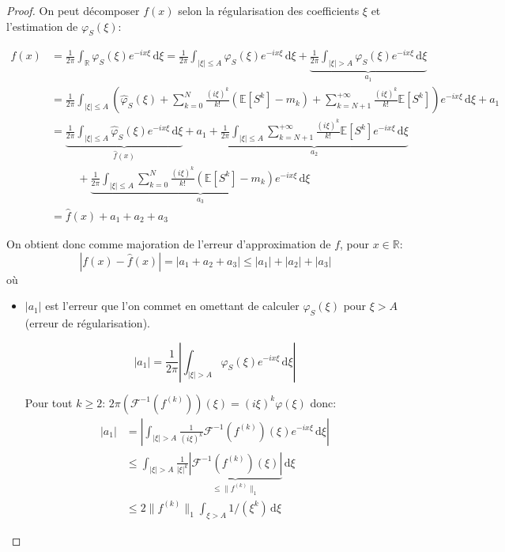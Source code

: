 \documentclass[12pt]{article}
\newcommand{\pth}[1]{\left(#1\right)}
\newcommand{\cro}[1]{\left[#1\right]}
\newcommand{\abs}[1]{\left|#1\right|}
\newcommand{\dabs}[1]{\|#1\|}
\newcommand{\esp}{\hspace{1cm}}
\newcommand{\Er}{\mathbb{R}}
\newcommand{\Esp}[1]{\mathbb{E}\cro{#1}}
\newcommand{\de}{\,\mathrm{d}}
\begin{document}
\begin{proof}
On peut décomposer $f(x)$ selon la régularisation des coefficients $\xi$ et l'estimation de $\varphi_S(\xi)$:

\begin{align*}
f(x) &= \frac1{2\pi} \int_{\mathbb R}\varphi_S(\xi)e^{-ix\xi}\de\xi
= \frac1{2\pi} \int_{\abs{\xi}\leqslant A}\varphi_S(\xi)e^{-ix\xi}\de\xi + \underbrace{\frac1{2\pi} \int_{\abs{\xi} > A}\varphi_S(\xi)e^{-ix\xi}\de\xi}_{a_1}\\
&= \frac1{2\pi} \int_{\abs{\xi}\leqslant A}\pth{\hat{\varphi}_S(\xi)+\sum_{k=0}^{N}\frac{(i\xi)^k}{k!}\pth{\Esp{S^k}-m_k}+\sum_{k=N+1}^{+\infty}\frac{(i\xi)^k}{k!}\Esp{S^k}}e^{-ix\xi}\de\xi + a_1\\
&= \underbrace{\frac1{2\pi} \int_{\abs{\xi}\leqslant A}\hat{\varphi}_S(\xi)e^{-ix\xi}\de\xi}_{\hat f(x)}
+ a_1
+ \underbrace{\frac1{2\pi}\int_{\abs{\xi}\leqslant A}\sum_{k=N+1}^{+\infty}\frac{(i\xi)^k}{k!}\Esp{S^k}e^{-ix\xi}\de\xi}_{a_2}\\
&\esp+ \underbrace{\frac1{2\pi}\int_{\abs{\xi}\leqslant A}\sum_{k=0}^{N}\frac{(i\xi)^k}{k!}\pth{\Esp{S^k}-m_k}e^{-ix\xi}\de\xi}_{a_3}\\
&= \hat{f}(x) + a_1 + a_2 + a_3
\end{align*}

On obtient donc comme majoration de l'erreur d'approximation de $f$, pour $x\in\Er$:
\[\abs{f(x)-\hat{f}(x)} = \abs{a_1 + a_2 + a_3}\leqslant |a_1| + |a_2| + |a_3|\]
où

\begin{itemize}
\item $\abs{a_1}$ est l'erreur que l'on commet en omettant de calculer $\varphi_S(\xi)$ pour $\xi>A$ (erreur de régularisation). %

\[\abs{a_1} = \frac1{2\pi} \abs{\int_{\abs{\xi} > A}\varphi_S(\xi)e^{-ix\xi}\de\xi}\]

  Pour tout $k\geqslant 2$: $2\pi\pth{\mathcal{F}^{-1}(f^{(k)})}(\xi)=(i\xi)^k\varphi(\xi)$ donc:
  \begin{align*}
    \abs{a_1}&=\abs{\int_{\abs{\xi}>A}\frac{1}{(i\xi)^k}\mathcal{F}^{-1}(f^{(k)})(\xi)e^{-ix\xi}\de\xi}\\
    &\leqslant \int_{\abs{\xi}>A}\frac{1}{\abs{\xi}^k}\underbrace{\abs{\mathcal{F}^{-1}(f^{(k)})(\xi)}}_{\leqslant\dabs{f^{(k)}}_{1}}\de\xi\\
    &\leqslant 2\dabs{f^{(k)}}_{1}\int_{\xi>A}1/(\xi^k)\de\xi
  \end{align*}


\end{itemize}
\end{proof}
\end{document}

